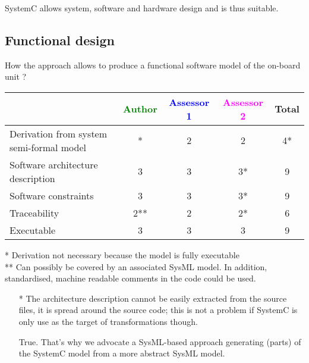\begin{author_comment}
SystemC allows system, software and hardware design and is thus suitable.
\end{author_comment}

\subsection{Functional design}

How the approach allows to produce a functional software model of the on-board unit ?

\begin{tabular}{|l | c | c | c | c|}
\hline
& \textcolor{green}{Author} & \textcolor{blue}{Assessor 1} & \textcolor{magenta}{Assessor 2} & Total \\
\hline
Derivation from system semi-formal model &* &2 &2 & 4* \\
\hline
Software architecture description &3 &3 &3* & 9 \\
\hline
Software constraints &3 &3 &3* & 9 \\
\hline
Traceability &2** &2 &2* & 6 \\
\hline
Executable &3 &3 &3 & 9 \\
\hline
\end{tabular}

\begin{author_comment}
* Derivation not necessary because the model is fully executable\\
** Can possibly be covered by an associated SysML model. In addition, standardised, machine readable comments in the code could be used.\\
\end{author_comment}

\begin{assessor2}
  \begin{itemize}
  \item[*] The architecture description cannot be easily extracted
    from the source files, it is spread around the source code; this
    is not a problem if SystemC is only use as the target of
    transformations though.
\begin{author_comment}
True. That's why we advocate a SysML-based approach generating (parts) of the SystemC model from a more abstract SysML model.
\end{author_comment}
  \end{itemize}  
\end{assessor2}


